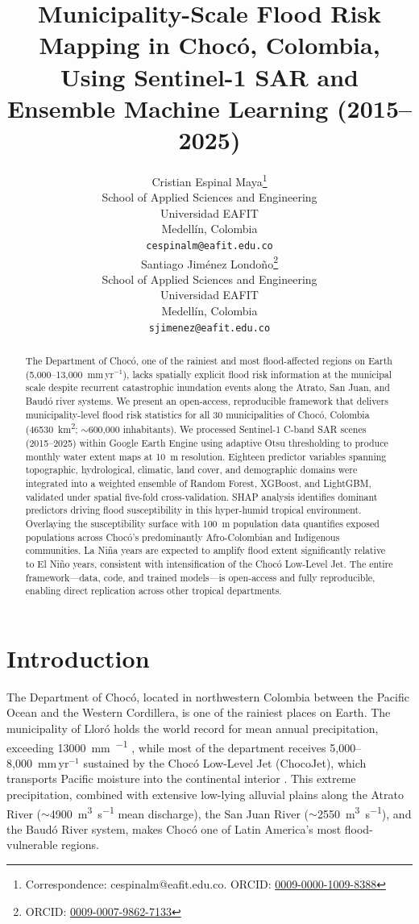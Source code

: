 \documentclass{article}
\title{Municipality-Scale Flood Risk Mapping in Choc\'o, Colombia, Using Sentinel-1 SAR and Ensemble Machine Learning (2015--2025)}
\author{
  Cristian Espinal Maya\thanks{Correspondence: cespinalm@eafit.edu.co. ORCID: \href{https://orcid.org/0009-0000-1009-8388}{0009-0000-1009-8388}} \\
  School of Applied Sciences and Engineering\\
  Universidad EAFIT\\
  Medell\'in, Colombia \\
  \texttt{cespinalm@eafit.edu.co} \\
  \And
  Santiago Jim\'enez Londo\~no\thanks{ORCID: \href{https://orcid.org/0009-0007-9862-7133}{0009-0007-9862-7133}} \\
  School of Applied Sciences and Engineering\\
  Universidad EAFIT\\
  Medell\'in, Colombia \\
  \texttt{sjimenez@eafit.edu.co} \\
}
\begin{document}
\maketitle

\begin{abstract}
The Department of Choc\'o, one of the rainiest and most flood-affected regions on Earth (5,000--13,000~mm\,yr$^{-1}$), lacks spatially explicit flood risk information at the municipal scale despite recurrent catastrophic inundation events along the Atrato, San Juan, and Baud\'o river systems. We present an open-access, reproducible framework that delivers municipality-level flood risk statistics for all 30 municipalities of Choc\'o, Colombia (\SI{46530}{\kilo\metre\squared}; $\sim$600,000 inhabitants). We processed Sentinel-1 C-band SAR scenes (2015--2025) within Google Earth Engine using adaptive Otsu thresholding to produce monthly water extent maps at \SI{10}{\metre} resolution. Eighteen predictor variables spanning topographic, hydrological, climatic, land cover, and demographic domains were integrated into a weighted ensemble of Random Forest, XGBoost, and LightGBM, validated under spatial five-fold cross-validation. SHAP analysis identifies dominant predictors driving flood susceptibility in this hyper-humid tropical environment. Overlaying the susceptibility surface with \SI{100}{\metre} population data quantifies exposed populations across Choc\'o's predominantly Afro-Colombian and Indigenous communities. La Ni\~na years are expected to amplify flood extent significantly relative to El Ni\~no years, consistent with intensification of the Choc\'o Low-Level Jet. The entire framework---data, code, and trained models---is open-access and fully reproducible, enabling direct replication across other tropical departments.
\end{abstract}


\section{Introduction}
\label{sec:introduction}

The Department of Choc\'o, located in northwestern Colombia between the Pacific Ocean and the Western Cordillera, is one of the rainiest places on Earth. The municipality of Llor\'o holds the world record for mean annual precipitation, exceeding \SI{13000}{\milli\metre\per\year} \citep{PovedaMesa2000}, while most of the department receives 5,000--8,000~mm\,yr$^{-1}$ sustained by the Choc\'o Low-Level Jet (ChocoJet), which transports Pacific moisture into the continental interior \citep{Poveda2023, CHOCOJEX2019, Gallego2021}. This extreme precipitation, combined with extensive low-lying alluvial plains along the Atrato River ($\sim$\SI{4900}{\cubic\metre\per\second} mean discharge), the San Juan River ($\sim$\SI{2550}{\cubic\metre\per\second}), and the Baud\'o River system, makes Choc\'o one of Latin America's most flood-vulnerable regions.
\end{document}
